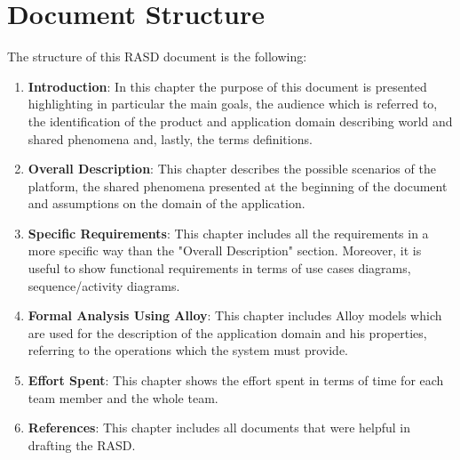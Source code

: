 \section{Document Structure}
The structure of this RASD document is the following:
\begin{enumerate}
    \item \textbf{Introduction}: In this chapter the purpose of this document is presented highlighting in particular the main goals, 
    the audience which is referred to, the identification of the product and application domain  describing world and shared phenomena and, 
    lastly, the terms definitions.
    \item \textbf{Overall Description}: This chapter describes the possible scenarios of the platform, the shared phenomena presented at the 
    beginning of the document and assumptions on the domain of the application.
    \item \textbf{Specific Requirements}: This chapter includes all the requirements in a more specific way than the "Overall Description" section. 
    Moreover, it is useful to show functional requirements in terms of use cases diagrams, sequence/activity diagrams.
    \item \textbf{Formal Analysis Using Alloy}: This chapter includes Alloy models which are used for the description of the application domain and 
    his properties, referring to the operations which the system must provide.
    \item \textbf{Effort Spent}: This chapter shows the effort spent in terms of time for each team member and the whole team.
    \item \textbf{References}: This chapter includes all documents that were helpful in drafting the RASD.
\end{enumerate}